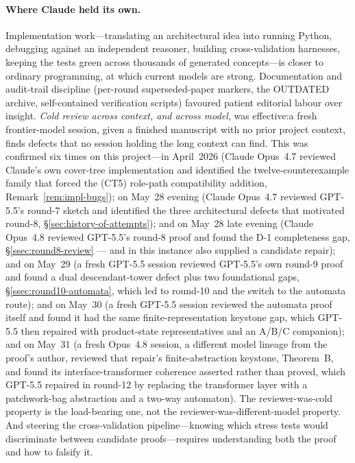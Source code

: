 \documentclass[
]{ceurart}
\theoremstyle{definition}
\begin{document}
\paragraph{Where Claude held its own.}
Implementation work---translating an architectural idea into
running Python, debugging against an independent reasoner,
building cross-validation harnesses, keeping the tests green
across thousands of generated concepts---is closer to ordinary
programming, at which current models are strong.  Documentation
and audit-trail discipline (per-round superseded-paper markers,
the OUTDATED archive, self-contained verification scripts)
favoured patient editorial labour over insight.  \emph{Cold
review across context, and across model}, was effective:\@ a
fresh frontier-model session, given a finished manuscript with
no prior project context, finds defects that no session holding
the long context can find.  This was confirmed six times on this
project---in April~2026 (Claude Opus~4.7 reviewed Claude's own
cover-tree implementation and identified the twelve-counterexample
family that forced the (CT5) role-path compatibility addition,
Remark~\ref{rem:impl-bugs}); on May~28 evening (Claude Opus~4.7
reviewed GPT-5.5's round-7 sketch and identified the three
architectural defects that motivated round-8,
\S\ref{sec:history-of-attempts}); and on May~28 late evening
(Claude Opus~4.8 reviewed GPT-5.5's round-8 proof and found the
D-1 completeness gap, \S\ref{ssec:round8-review} --- and in this
instance also supplied a candidate repair); and on May~29 (a fresh
GPT-5.5 session reviewed GPT-5.5's own round-9 proof and found a dual
descendant-tower defect plus two foundational gaps,
\S\ref{ssec:round10-automata}, which led to round-10 and the switch to
the automata route); and on May~30 (a fresh GPT-5.5 session reviewed the
automata proof itself and found it had the same finite-representation
keystone gap, which GPT-5.5 then repaired with product-state
representatives and an A/B/C companion); and on May~31 (a fresh
Opus~4.8 session, a different model lineage from the proof's author,
reviewed that repair's finite-abstraction keystone, Theorem~B, and
found its interface-transformer coherence asserted rather than proved,
which GPT-5.5 repaired in round-12 by replacing the transformer layer
with a patchwork-bag abstraction and a two-way automaton).  The reviewer-was-cold
property is the load-bearing one, not the reviewer-was-different-model
property.  And steering the cross-validation pipeline---knowing
which stress tests would discriminate between candidate proofs---requires
understanding both the proof and how to falsify it.
\end{document}
